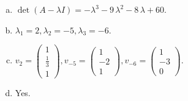\begin{questions}
\begin{solution}
\begin{enumerate}[(a)]
\item $\det(A-\lambda I)=-{\lambda}^{3} - 9 \, {\lambda}^{2} - 8 \, {\lambda} + 60$.
\item ${\lambda}_1=2, {\lambda}_2=-5, {\lambda}_3=-6$.
\item $v_{2}=\left(\begin{array}{r}
1 \\
\frac{1}{3} \\
1
\end{array}\right), v_{-5}=\left(\begin{array}{r}
1 \\
-2 \\
1
\end{array}\right), v_{-6}=\left(\begin{array}{r}
1 \\
-3 \\
0
\end{array}\right)$.
\item Yes.
\end{enumerate}
\end{solution}

\end{questions}

\newpage


\begin{center}
\end{center}

